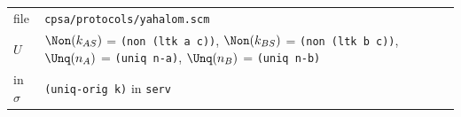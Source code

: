 \par\smallskip\noindent\begin{tabular}{@{}l p{}@{}}
file & \texttt{cpsa/protocols/yahalom.scm}\\
$U$ & $\Non(k_{AS})$ = \texttt{(non (ltk a c))}, $\Non(k_{BS})$ = \texttt{(non (ltk b c))}, $\Unq(n_A)$ = \texttt{(uniq n-a)}, $\Unq(n_B)$ = \texttt{(uniq n-b)}\\
in $\sigma$ & \texttt{(uniq-orig k)} in \texttt{serv}\\
\end{tabular}


